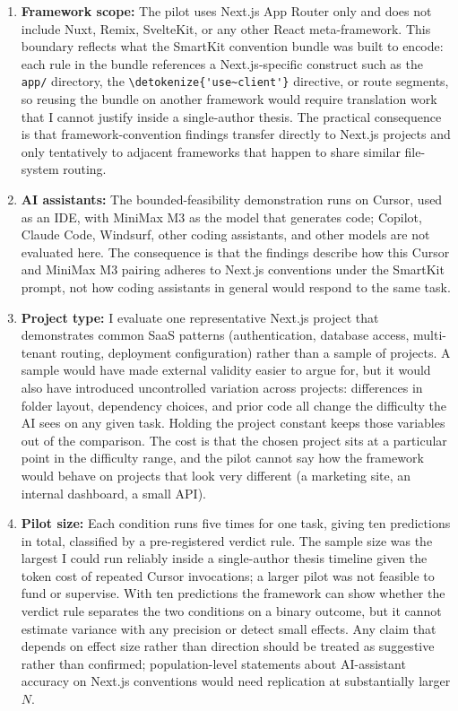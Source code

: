\documentclass[12pt,a4paper]{report}
\newcommand{\code}[1]{\texttt{\nolinkurl{\detokenize{#1}}}}
\DeclareRobustCommand{\filename}[1]{\bgroup\urlstyle{tt}\nolinkurl{#1}\egroup}
\newcommand{\usec}{\code{'use~client'}}
\begin{document}
\begin{enumerate}
    \item \textbf{Framework scope:}
    The pilot uses Next.js App Router only and does not include
    Nuxt, Remix, SvelteKit, or any other React meta-framework. This
    boundary reflects what the SmartKit convention bundle was built
    to encode: each rule in the bundle references a Next.js-specific
    construct such as the \filename{app/} directory, the \usec{}
    directive, or route segments, so reusing the bundle on another
    framework would require translation work that I cannot justify
    inside a single-author thesis. The practical consequence is that
    framework-convention findings transfer directly to Next.js
    projects and only tentatively to adjacent frameworks that happen
    to share similar file-system routing.

    \item \textbf{AI assistants:}
    The bounded-feasibility demonstration runs on Cursor, used as an
    IDE, with MiniMax M3 as the model that generates code; Copilot,
    Claude Code, Windsurf, other coding assistants, and other models
    are not evaluated here. The consequence is that the findings
    describe how this Cursor and MiniMax M3 pairing adheres to Next.js
    conventions under the SmartKit prompt, not how coding assistants
    in general would respond to the same task.

    \item \textbf{Project type:}
    I evaluate one representative Next.js project that demonstrates
    common SaaS patterns (authentication, database access, multi-tenant
    routing, deployment configuration) rather than a sample of
    projects. A sample would have made external validity easier to
    argue for, but it would also have introduced uncontrolled
    variation across projects: differences in folder layout,
    dependency choices, and prior code all change the difficulty the
    AI sees on any given task. Holding the project constant keeps
    those variables out of the comparison. The cost is that the
    chosen project sits at a particular point in the difficulty
    range, and the pilot cannot say how the framework would behave
    on projects that look very different (a marketing site, an
    internal dashboard, a small API).

    \item \textbf{Pilot size:}
    Each condition runs five times for one task, giving ten
    predictions in total, classified by a pre-registered verdict
    rule. The sample size was the largest I could run reliably
    inside a single-author thesis timeline given the token cost of
    repeated Cursor invocations; a larger pilot was not feasible to
    fund or supervise. With ten predictions the framework can show
    whether the verdict rule separates the two conditions on a
    binary outcome, but it cannot estimate variance with any
    precision or detect small effects. Any claim that depends on
    effect size rather than direction should be treated as
    suggestive rather than confirmed; population-level statements
    about AI-assistant accuracy on Next.js conventions would need
    replication at substantially larger $N$.


\end{enumerate}
\end{document}
